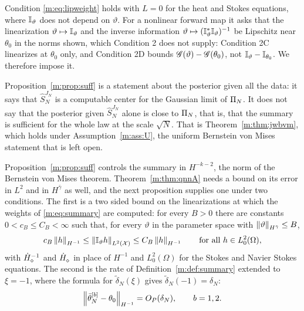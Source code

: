 Condition \eqref{m:eq:lipweight} holds with $L=0$ for the heat and Stokes equations, where $\mathbb{I}_\vartheta$ does not depend on $\vartheta$. For a nonlinear forward map it asks that the linearization $\vartheta\mapsto\mathbb{I}_\vartheta$ and the inverse information $\vartheta\mapsto(\mathbb{I}^*_\vartheta\mathbb{I}_\vartheta)^{-1}$ be Lipschitz near $\theta_0$ in the norms shown, which Condition 2 does not supply: Condition 2C linearizes at $\theta_0$ only, and Condition 2D bounds $\mathscr{G}(\vartheta)-\mathscr{G}(\theta_0)$, not $\mathbb{I}_\vartheta-\mathbb{I}_{\theta_0}$. We therefore impose it.

Proposition~\ref{m:prop:suff} is a statement about the posterior given all the data: it says that $\hat S^{J_N}_N$ is a computable center for the Gaussian limit of $\Pi_N$. It does not say that the posterior given $\hat S^{J_N}_N$ alone is close to $\Pi_N$, that is, that the summary is sufficient for the whole law at the scale $\sqrt N$. That is Theorem~\ref{m:thm:jwbvm}, which holds under Assumption~\ref{m:ass:U}, the uniform Bernstein von Mises statement that is left open.

Proposition~\ref{m:prop:suff} controls the summary in $H^{-k-2}$, the norm of the Bernstein von Mises theorem. Theorem~\ref{m:thm:qnnA} needs a bound on its error in $L^2$ and in $H^{\bar\gamma}$ as well, and the next proposition supplies one under two conditions. The first is a two sided bound on the linearizations at which the weights of \eqref{m:eq:summary} are computed: for every $B>0$ there are constants $0<c_B\le C_B<\infty$ such that, for every $\vartheta$ in the parameter space with $\left\|\vartheta\right\|_{H^{\bar\gamma}}\le B$,
\begin{equation}\label{m:eq:infobound}
c_B\left\|h\right\|_{H^{-1}}\le\left\|\mathbb{I}_\vartheta h\right\|_{L^2(\mathcal X)}\le C_B\left\|h\right\|_{H^{-1}}\qquad\text{for all }h\in L^2_0(\Omega),
\end{equation}
with $\dot H^{-1}_\diamond$ and $\dot H^{}_\diamond$ in place of $H^{-1}$ and $L^2_0(\Omega)$ for the Stokes and Navier Stokes equations. The second is the rate of Definition~\ref{m:def:summary} extended to $\xi=-1$, where the formula for $\tilde\delta_N(\xi)$ gives $\tilde\delta_N(-1)=\delta_N$:
\begin{equation}\label{m:eq:pilotrate}
\left\|\bar\theta^{[b]}_N-\theta_0\right\|_{H^{-1}}=O_P(\delta_N),\qquad b=1,2 .
\end{equation}

